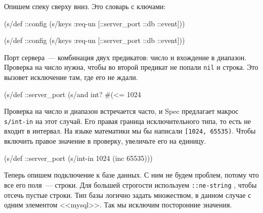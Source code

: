 \noindent
Опишем спеку сверху вниз. Это словарь с ключами:

\ifnarrow

\begin{english}
  \begin{clojure}
(s/def ::config
  (s/keys :req-un [::server_port
                   ::db ::event]))
  \end{clojure}
\end{english}

\else

\begin{english}
  \begin{clojure}
(s/def ::config
  (s/keys :req-un [::server_port ::db ::event]))
  \end{clojure}
\end{english}

\fi


Порт сервера~--- комбинация двух предикатов: число и вхождение в диапазон.
Проверка на число нужна, чтобы во второй предикат не попали \verb|nil| и
строка. Это вызовет исключение там, где его не ждали.

\begin{english}
  \begin{clojure}
(s/def ::server_port
  (s/and int? #(<= 1024 %
  \end{clojure}
\end{english}


Проверка на число и диапазон встречается часто, и Spec предлагает макрос
\verb|s/int-in| на этот случай. Его правая граница исключительного типа, то есть
не входит в интервал. На языке математики мы бы написали \verb|[1024, 65535)|.
Чтобы включить правое значение в проверку, увеличьте его на единицу.

\begin{english}
  \begin{clojure}
(s/def ::server_port
  (s/int-in 1024 (inc 65535)))
  \end{clojure}
\end{english}


Теперь опишем подключение к базе данных. С ним не будем проблем, потому что все
его поля~--- строки. Для большей строгости используем \verb|::ne-string| ,
чтобы отсечь пустые строки. Тип базы логично задать множеством, в данном
случае с одним элементом <<mysql>>. Так мы исключим посторонние значения.

